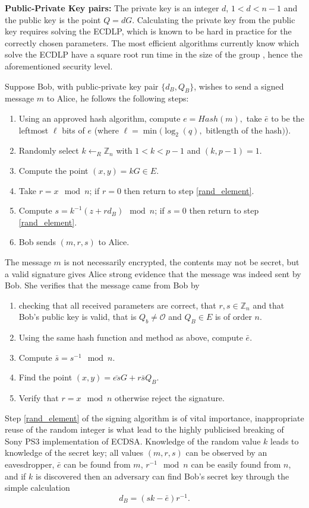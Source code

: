 \documentclass[twocolumn]{svjour3}
\newcommand{\Z}{{\mathbb Z}}
\begin{document}
{\bf{Public-Private Key pairs:}} The private key is an integer $d$, $1<d<n-1$ and the public key is the point $Q=dG$. Calculating the private key from the public key requires solving the ECDLP, which is known to be hard in practice for the correctly chosen parameters. The most efficient algorithms currently know which solve the ECDLP have a square root run time in the size of the group \cite{WienerZ98,GallantLV00}, hence the aforementioned security level.
\vspace{0.5cm}

Suppose Bob, with public-private key pair $\{d_B,Q_B\}$, wishes to send a signed message $m$ to Alice, he follows the following steps:
\begin{enumerate}
\item Using an approved hash algorithm, compute $e=Hash(m),$ take $\bar{e}$ to be the leftmost $\ell$ bits of $e$ (where $\ell=\min(\log_2(q),$ bit\-length of the hash$)$). 
\item\label{rand_element} Randomly select $k\leftarrow_R\Z_n$ with $1<k<p-1$ and $(k,p-1)=1$.
\item\label{scalar_mult} Compute the point $(x,y)=kG\in E$. 
\item Take $r=x\mod n$; if $r=0$ then return to step \ref{rand_element}.
\item Compute $s=k^{-1}(z+rd_B)\mod n$; if $s=0$ then return to step \ref{rand_element}.
\item Bob sends $(m,r,s)$ to Alice.
\end{enumerate}
The message $m$ is not necessarily encrypted, the contents may not be secret, but a valid signature gives Alice strong evidence that the message was indeed sent by Bob. She verifies that the message came from Bob by 

\begin{enumerate}
\item checking that all received parameters are correct, that $r,s\in\Z_n$ and that Bob's public key is valid, that is $Q_b\neq \mathcal{O}$ and $Q_B\in E$ is of order $n$.
\item Using the same hash function and method as above, compute $\bar{e}$.
\item Compute $\bar{s}=s^{-1}\mod n$.
\item Find the point $(x,y)=\bar{es}G+r\bar{s}Q_B$.
\item Verify that $r=x\mod n$ otherwise reject the signature.
\end{enumerate}

Step \ref{rand_element} of the signing algorithm is of vital importance, inappropriate reuse of the random integer is what lead to the highly publicised breaking of Sony PS3 implementation of ECDSA. Knowledge of the random value $k$ leads to knowledge of the secret key; all values $(m,r,s)$ can be observed by an eavesdropper, $\bar{e}$ can be found from $m$, $r^{-1}\mod n$ can be easily found from $n$, and if $k$ is discovered then an adversary can find Bob's secret key through the simple calculation $$d_B=(sk-\bar{e})r^{-1}.$$
\end{document}
